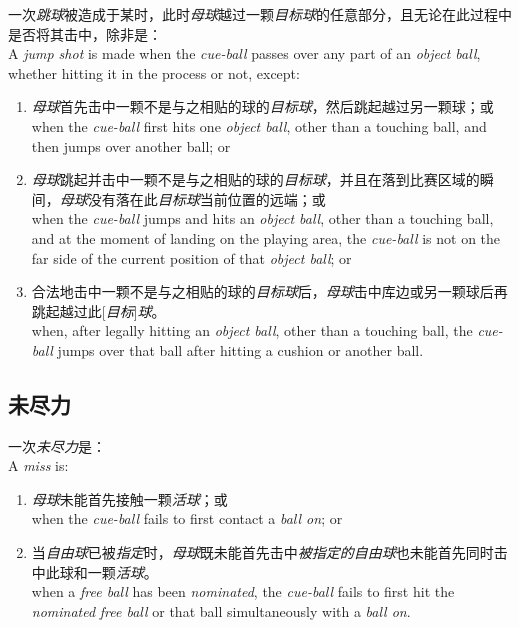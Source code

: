 \noindent 一次\textit{跳球}被造成于某时，此时\textit{母球}越过一颗\textit{目标球}的任意部分，且无论在此过程中是否将其击中，除非是：\\
A \textit{jump shot} is made when the \textit{cue-ball} passes over any part of an \textit{object ball}, whether hitting it in the process or not, except:
\begin{enumerate}[label=(\alph*)]
    \item \textit{母球}首先击中一颗不是与之相贴的球的\textit{目标球}，然后跳起越过另一颗球；或\\
    when the \textit{cue-ball} first hits one \textit{object ball}, other than a touching ball, and then jumps over another ball; or
    \item \textit{母球}跳起并击中一颗不是与之相贴的球的\textit{目标球}，并且在落到比赛区域的瞬间，\textit{母球}没有落在此\textit{目标球}当前位置的远端；或\\
    when the \textit{cue-ball} jumps and hits an \textit{object ball}, other than a touching ball, and at the moment of landing on the playing area, the \textit{cue-ball} is not on the far side of the current position of that \textit{object ball}; or
    \item 合法地击中一颗不是与之相贴的球的\textit{目标球}后，\textit{母球}击中库边或另一颗球后再跳起越过此[\textit{目标}]\textit{球}。\\
    when, after legally hitting an \textit{object ball}, other than a touching ball, the \textit{cue-ball} jumps over that ball after hitting a cushion or another ball.
\end{enumerate}

\subsection{未尽力}

\noindent 一次\textit{未尽力}是：\\
A \textit{miss} is:
\begin{enumerate}[label=(\alph*)]
    \item \textit{母球}未能首先接触一颗\textit{活球}；或\\
    when the \textit{cue-ball} fails to first contact a \textit{ball on}; or
    \item 当\textit{自由球}已被\textit{指定}时，\textit{母球}既未能首先击中\textit{被指定的}\textit{自由球}也未能首先同时击中此球和一颗\textit{活球}。\\
    when a \textit{free ball} has been \textit{nominated}, the \textit{cue-ball} fails to first hit the \textit{nominated} \textit{free ball} or that ball simultaneously with a \textit{ball on}.
\end{enumerate}

